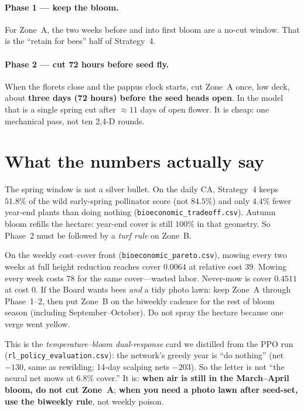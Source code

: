 \documentclass[11pt]{article}
\begin{document}
\paragraph{Phase 1 --- keep the bloom.}
For Zone~A, the two weeks before and into first bloom are a no-cut
window. That is the ``retain for bees'' half of Strategy~4.

\paragraph{Phase 2 --- cut 72 hours before seed fly.}
When the florets close and the pappus clock starts, cut Zone~A once,
low deck, about \textbf{three days (72 hours) before the seed heads open}.
In the model that is a single spring cut after $\approx 11$ days of open
flower. It is cheap: one mechanical pass, not ten 2,4-D rounds.

\section*{What the numbers actually say}

The spring window is not a silver bullet.
On the daily CA, Strategy~4 keeps $\mathbf{51.8\%}$ of the wild
early-spring pollinator score (not $84.5\%$) and only
$\mathbf{4.4\%}$ fewer year-end plants than doing nothing
(\texttt{bioeconomic\_tradeoff.csv}).
Autumn bloom refills the hectare: year-end cover is still $100\%$
in that geometry.
So Phase~2 must be followed by a \emph{turf rule} on Zone~B.

On the weekly cost--cover front
(\texttt{bioeconomic\_pareto.csv}),
mowing every two weeks at full height reduction reaches cover
$\mathbf{0.0064}$ at relative cost $39$.
Mowing every week costs $78$ for the same cover---wasted labor.
Never-mow is cover $0.4511$ at cost $0$.
If the Board wants bees \emph{and} a tidy photo lawn:
keep Zone~A through Phase~1--2, then put Zone~B on the biweekly cadence
for the rest of bloom season (including September--October).
Do not spray the hectare because one verge went yellow.

This is the \emph{temperature--bloom dual-response} card we distilled from
the PPO run (\texttt{rl\_policy\_evaluation.csv}): the network's greedy
year is ``do nothing'' (net $-130$, same as rewilding; 14-day scalping
nets $-203$).
So the letter is not ``the neural net mows at 6.8\% cover.''
It is: \textbf{when air is still in the March--April bloom, do not cut
Zone~A}; \textbf{when you need a photo lawn after seed-set, use the
biweekly rule}, not weekly poison.
\end{document}

